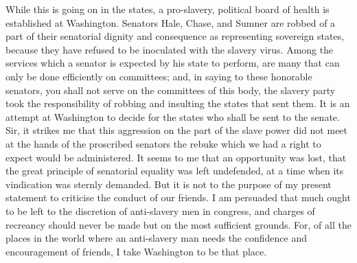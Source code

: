 While this is going on in the states, a pro-slavery, political board of
health is established at Washington. Senators Hale, Chase, and Sumner
are robbed of a part of their senatorial dignity and consequence as
representing sovereign states, because they have refused to be
inoculated with the slavery virus. Among the services which a senator is
expected by his state to perform, are many that can only be done
efficiently on committees; and, in saying to these honorable senators,
you shall not serve on the committees of this body, {}the slavery party
took the responsibility of robbing and insulting the states that sent
them. It is an attempt at Washington to decide for the states who shall
be sent to the senate. Sir, it strikes me that this aggression on the
part of the slave power did not meet at the hands of the proscribed
senators the rebuke which we had a right to expect would be
administered. It seems to me that an opportunity was lost, that the
great principle of senatorial equality was left undefended, at a time
when its vindication was sternly demanded. But it is not to the purpose
of my present statement to criticise the conduct of our friends. I am
persuaded that much ought to be left to the discretion of anti-slavery
men in congress, and charges of recreancy should never be made but on
the most sufficient grounds. For, of all the places in the world where
an anti-slavery man needs the confidence and encouragement of friends, I
take Washington to be that place.

